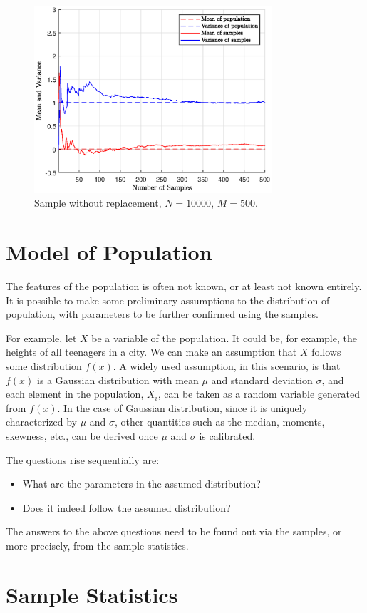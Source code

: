 \begin{figure}
	\centering
	\includegraphics[width=250pt]{chapters/ch-sampling/figures/sample-nwr-n10000.eps}
	\caption{Sample without replacement, $N=10000$, $M=500$.} \label{ch:sampling:fig:sample-nwr-n10000}
\end{figure}

\section{Model of Population}

The features of the population is often not known, or at least not known entirely. It is possible to make some preliminary assumptions to the distribution of population, with parameters to be further confirmed using the samples.

For example, let $X$ be a variable of the population. It could be, for example, the heights of all teenagers in a city. We can make an assumption that $X$ follows some distribution $f(x)$. A widely used assumption, in this scenario, is that $f(x)$ is a Gaussian distribution with mean $\mu$ and standard deviation $\sigma$, and each element in the population, $X_i$, can be taken as a random variable generated from $f(x)$. In the case of Gaussian distribution, since it is uniquely characterized by $\mu$ and $\sigma$, other quantities such as the median, moments, skewness, etc., can be derived once $\mu$ and $\sigma$ is calibrated.

The questions rise sequentially are:
\begin{itemize}
  \item What are the parameters in the assumed distribution?
  \item Does it indeed follow the assumed distribution?
\end{itemize}
The answers to the above questions need to be found out via the samples, or more precisely, from the sample statistics.

\section{Sample Statistics}





